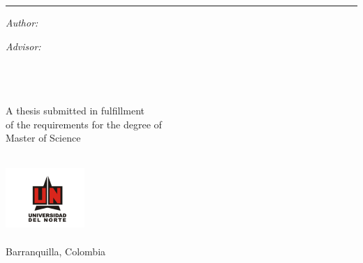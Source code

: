 \begin{titlepage}
  \doublespacing
  \large
  \hfill
  \vfill
  \vspace*{0.5cm}
  \begin{center}
    \doublespacing
    \textcolor{black}{\huge\textbf{\myTitle}}
  \end{center}
  \vspace{1.25cm}
  \hrule
  \vspace{1.5cm}
  \onehalfspacing
  \begin{center}

    \begin{minipage}[t]{0.5\textwidth}
      \begin{flushleft}
        \emph{Author:}\\
        {{\myFirstName} \textsc{\myLastName}}
      \end{flushleft}
    \end{minipage}
    \begin{minipage}[t]{0.4\textwidth}
      \begin{flushright}
        \emph{Advisor:} \\
        { {\myProfFirstName} \textsc{\myProfLastName}{\myProfTitle}}\\
        { {\myOtherProfFirstName} \textsc{\myOtherProfLastName}{\myOtherProfTitle}}\\
      \end{flushright}
    \end{minipage}\\[1.5cm]
    
    A thesis submitted in fulfillment\\
    of the requirements for the degree of\\
    {Master of Science}\\[1cm]
    
    \myDepartment\\

    \hfill
    \vfill

    \includegraphics[width=3cm]{figures/UN-logo.png}\\
    \href{https://latrobe.edu.au}{\myUni}\\
    Barranquilla, Colombia\\[2em]
    {\mySubmissionMonth} {\mySubmissionYear}
  \end{center}
\end{titlepage}
